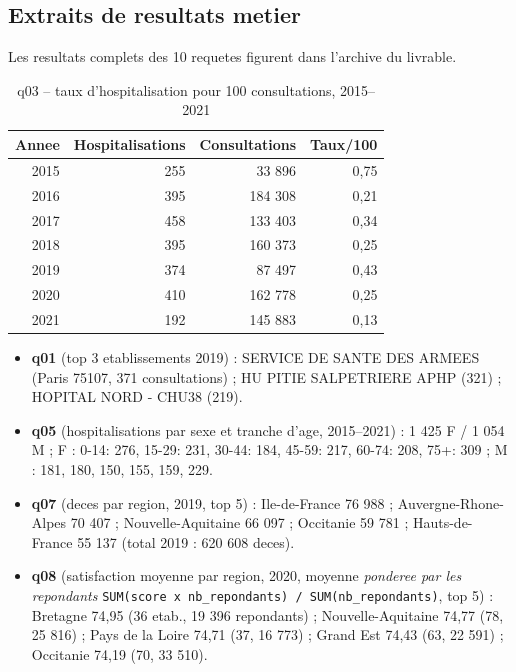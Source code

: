 \documentclass[11pt,a4paper]{article}
\begin{document}
\subsection{Extraits de resultats metier}
Les resultats complets des 10 requetes figurent dans l'archive du livrable.

\begin{table}[H]\centering\small
\caption{q03 -- taux d'hospitalisation pour 100 consultations, 2015--2021}
\begin{tabular}{rrrr}
\toprule
\textbf{Annee} & \textbf{Hospitalisations} & \textbf{Consultations} & \textbf{Taux/100} \\
\midrule
2015 & 255 & 33 896 & 0,75 \\
2016 & 395 & 184 308 & 0,21 \\
2017 & 458 & 133 403 & 0,34 \\
2018 & 395 & 160 373 & 0,25 \\
2019 & 374 & 87 497 & 0,43 \\
2020 & 410 & 162 778 & 0,25 \\
2021 & 192 & 145 883 & 0,13 \\
\bottomrule
\end{tabular}
\end{table}

\begin{itemize}[leftmargin=*]
\item \textbf{q01} (top 3 etablissements 2019) : SERVICE DE SANTE DES ARMEES (Paris 75107,
      371 consultations) ; HU PITIE SALPETRIERE APHP (321) ; HOPITAL NORD - CHU38 (219).
\item \textbf{q05} (hospitalisations par sexe et tranche d'age, 2015--2021) : 1 425 F /
      1 054 M ; F : 0-14: 276, 15-29: 231, 30-44: 184, 45-59: 217, 60-74: 208, 75+: 309 ;
      M : 181, 180, 150, 155, 159, 229.
\item \textbf{q07} (deces par region, 2019, top 5) : Ile-de-France 76 988 ;
      Auvergne-Rhone-Alpes 70 407 ; Nouvelle-Aquitaine 66 097 ; Occitanie 59 781 ;
      Hauts-de-France 55 137 (total 2019 : 620 608 deces).
\item \textbf{q08} (satisfaction moyenne par region, 2020, moyenne \emph{ponderee par les
      repondants} \texttt{SUM(score x nb\_repondants) / SUM(nb\_repondants)}, top 5) :
      Bretagne 74,95 (36 etab., 19 396 repondants) ; Nouvelle-Aquitaine 74,77 (78, 25 816) ;
      Pays de la Loire 74,71 (37, 16 773) ; Grand Est 74,43 (63, 22 591) ;
      Occitanie 74,19 (70, 33 510).
\end{itemize}
\end{document}
